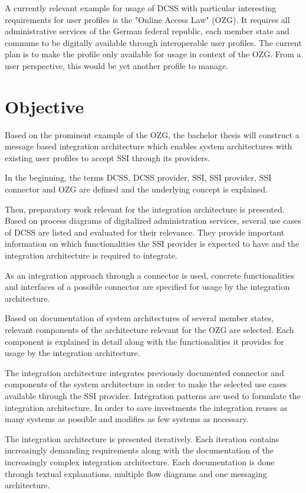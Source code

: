 \documentclass[
     12pt,         %
     a4paper,      %
     BCOR=10mm,version=first,     %
     DIV=14,version=first,        %
     ]{scrreprt}
\begin{document}
A currently relevant example for usage of DCSS with particular interesting requirements for user profiles is the "Online Access Law" (OZG). It requires all administrative services of the German federal republic, each member state and commune to be digitally available through interoperable user profiles. The current plan is to make the profile only available for usage in context of the OZG. From a user perspective, this would be yet another profile to manage.

\chapter{Objective}

Based on the prominent example of the OZG, the bachelor thesis will construct a message based integration architecture which enables system architectures with existing user profiles to accept SSI through its providers. 

In the beginning, the terms DCSS, DCSS provider, SSI, SSI provider, SSI connector and OZG are defined and the underlying concept is explained.

Then, preparatory work relevant for the integration architecture is presented. Based on process diagrams of digitalized administration services, several use cases of DCSS are listed and evaluated for their relevance. They provide important information on which functionalities the SSI provider is expected to have and the integration architecture is required to integrate.

As an integration approach through a connector is used, concrete functionalities and interfaces of a possible connector are specified for usage by the integration architecture.

Based on documentation of system architectures of several member states, relevant components of the architecture relevant for the OZG are selected. Each component is explained in detail along with the functionalities it provides for usage by the integration architecture.

The integration architecture integrates previously documented connector and components of the system architecture in order to make the selected use cases available through the SSI provider. Integration patterns are used to formulate the integration architecture. In order to save investments the integration reuses as many systems as possible and modifies as few systems as necessary.

The integration architecture is presented iteratively. Each iteration contains increasingly demanding requirements along with the documentation of the increasingly complex integration architecture. Each documentation is done through textual explanations, multiple flow diagrams and one messaging architecture.
\end{document}
